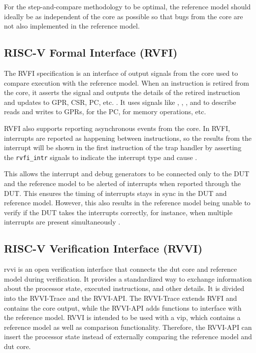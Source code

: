For the step-and-compare methodology to be optimal, the reference model should ideally be as independent of the core as possible so that bugs from the core are not also implemented in the reference model.

\subsection{RISC-V Formal Interface (RVFI)}
\label{sec:rvfi}

The RVFI specification is an interface of output signals from the core used to compare execution with the reference model. 
When an instruction is retired from the core, it asserts the  signal and outputs the details of the retired instruction and updates to GPR, CSR, PC, etc. \cite{symbioticedaRiscvformalDocsRvfi2020}. It uses signals like , , , and  to describe reads and writes to GPRs,  for the PC,  for memory operations, etc.

RVFI also supports reporting asynchronous events from the core. In RVFI, interrupts are reported as happening between instructions, so the results from the interrupt will be shown in the first instruction of the trap handler by asserting the \lstinline{rvfi_intr} signals to indicate the interrupt type and cause \cite{openhwgroupRISCVFormalInterface2023}.

This allows the interrupt and debug generators to be connected only to the DUT and the reference model to be alerted of interrupts when reported through the DUT.
This ensures the timing of interrupts stays in sync in the DUT and reference model. However, this also results in the reference model being unable to verify if the DUT takes the interrupts correctly, for instance, when multiple interrupts are present simultaneously \cite{taylorAdvancedRISCVVerification2023}.

\subsection{RISC-V Verification Interface (RVVI)}
\label{sec:rvvi}

\acrfull{rvvi} \cite{riscv-verificationRISCVVerificationInterface2023} is an open verification interface that connects the \acrshort{dut} core and reference model during verification. It provides a standardized way to exchange information about the processor state, executed instructions, and other details. It is divided into the RVVI-Trace and the RVVI-API. The RVVI-Trace extends RVFI and contains the core output, while the RVVI-API adds functions to interface with the reference model. RVVI is intended to be used with a \acrshort{vip}, which contains a reference model as well as comparison functionality. Therefore, the RVVI-API can insert the processor state instead of externally comparing the reference model and \acrshort{dut} core.

